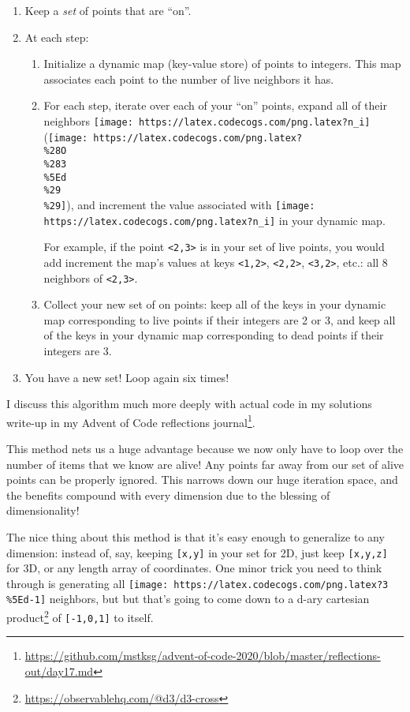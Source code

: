 \documentclass[]{article}
\renewcommand{\href}[2]{#2\footnote{\url{#1}}}
\begin{document}
\begin{enumerate}
\def\labelenumi{\arabic{enumi}.}
\tightlist
\item
  Keep a \emph{set} of points that are ``on''.
\item
  At each step:

  \begin{enumerate}
  \def\labelenumii{\alph{enumii}.}
  \item
    Initialize a dynamic map (key-value store) of points to integers. This map
    associates each point to the number of live neighbors it has.
  \item
    For each step, iterate over each of your ``on'' points, expand all of their
    neighbors \texttt{[image: https://latex.codecogs.com/png.latex?n\_i]}
    (\texttt{[image: https://latex.codecogs.com/png.latex?\\\%28O\\\%283\\\%5Ed\\\%29\\\%29]}),
    and increment the value associated with
    \texttt{[image: https://latex.codecogs.com/png.latex?n\_i]} in your dynamic
    map.

    For example, if the point \texttt{\textless{}2,3\textgreater{}} is in your
    set of live points, you would add increment the map's values at keys
    \texttt{\textless{}1,2\textgreater{}},
    \texttt{\textless{}2,2\textgreater{}},
    \texttt{\textless{}3,2\textgreater{}}, etc.: all 8 neighbors of
    \texttt{\textless{}2,3\textgreater{}}.
  \item
    Collect your new set of on points: keep all of the keys in your dynamic map
    corresponding to live points if their integers are 2 or 3, and keep all of
    the keys in your dynamic map corresponding to dead points if their integers
    are 3.
  \end{enumerate}
\item
  You have a new set! Loop again six times!
\end{enumerate}

I discuss this algorithm much more deeply with actual code in
\href{https://github.com/mstksg/advent-of-code-2020/blob/master/reflections-out/day17.md}{my
solutions write-up in my Advent of Code reflections journal}.

This method nets us a huge advantage because we now only have to loop over the
number of items that we know are alive! Any points far away from our set of
alive points can be properly ignored. This narrows down our huge iteration
space, and the benefits compound with every dimension due to the blessing of
dimensionality!

The nice thing about this method is that it's easy enough to generalize to any
dimension: instead of, say, keeping \texttt{{[}x,y{]}} in your set for 2D, just
keep \texttt{{[}x,y,z{]}} for 3D, or any length array of coordinates. One minor
trick you need to think through is generating all
\texttt{[image: https://latex.codecogs.com/png.latex?3\\\%5Ed-1]} neighbors, but
but that's going to come down to a d-ary
\href{https://observablehq.com/@d3/d3-cross}{cartesian product} of
\texttt{{[}-1,0,1{]}} to itself.
\end{document}
